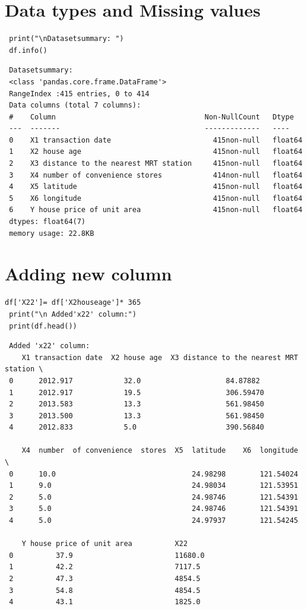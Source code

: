 \section{Data types and Missing values}
\vspace{-.6cm}
\begin{code}
\begin{lstlisting}
 print("\nDatasetsummary: ")
 df.info()
\end{lstlisting}
\end{code}
\vspace{-1cm}
\begin{verbatim}
 Datasetsummary:
 <class 'pandas.core.frame.DataFrame'>
 RangeIndex :415 entries, 0 to 414
 Data columns (total 7 columns):
 #    Column                                   Non-NullCount   Dtype
 ---  -------                                  -------------   ----
 0    X1 transaction date                        415non-null   float64
 1    X2 house age                               415non-null   float64
 2    X3 distance to the nearest MRT station     415non-null   float64
 3    X4 number of convenience stores            414non-null   float64
 4    X5 latitude                                415non-null   float64
 5    X6 longitude                               415non-null   float64
 6    Y house price of unit area                 415non-null   float64
 dtypes: float64(7)
 memory usage: 22.8KB
\end{verbatim}
\section{Adding new column}
\begin{lstlisting}
df['X22']= df['X2houseage']* 365
 print("\n Added'x22' column:")
 print(df.head())

\end{lstlisting}
\begin{verbatim}
 Added 'x22' column:
    X1 transaction date  X2 house age  X3 distance to the nearest MRT station \
 0      2012.917            32.0                    84.87882
 1      2012.917            19.5                    306.59470
 2      2013.583            13.3                    561.98450
 3      2013.500            13.3                    561.98450
 4      2012.833            5.0                     390.56840
 
    X4  number  of convenience  stores  X5  latitude    X6  longitude \
 0      10.0                                24.98298        121.54024
 1      9.0                                 24.98034        121.53951
 2      5.0                                 24.98746        121.54391
 3      5.0                                 24.98746        121.54391
 4      5.0                                 24.97937        121.54245
 
    Y house price of unit area          X22
 0          37.9                        11680.0
 1          42.2                        7117.5
 2          47.3                        4854.5
 3          54.8                        4854.5
 4          43.1                        1825.0

\end{verbatim}
